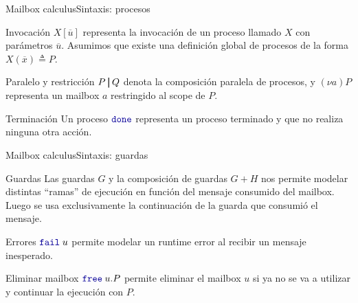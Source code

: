 \documentclass{beamer}
\newcommand{\done}{\texttt{\textcolor{keyword}{done}}}
\newcommand{\free}[1]{\texttt{\textcolor{keyword}{free}}\hspace{0.25em}#1}
\newcommand{\fail}[1]{\texttt{\textcolor{keyword}{fail}}\hspace{0.25em}#1}
\newcommand{\parbar}{\kern3pt\rule[-3pt]{0.8pt}{0.9\baselineskip}\kern3pt}
\begin{document}
\begin{frame}{Mailbox calculus}{Sintaxis: procesos}
    \begin{block}{Invocación}
        $X[\overline{u}]$ representa la invocación de un proceso llamado $X$ con parámetros $\overline{u}$. Asumimos que existe una definición global de procesos de la forma $X(\overline{x}) \triangleq P$.
    \end{block}

    \begin{block}{Paralelo y restricción}
        $P \parbar Q$ denota la composición paralela de procesos, y $(\nu a) P$ representa un mailbox $a$ restringido al scope de $P$.
    \end{block}

    \begin{block}{Terminación}
        Un proceso $\done$ representa un proceso terminado y que no realiza ninguna otra acción.
    \end{block}
\end{frame}

\begin{frame}{Mailbox calculus}{Sintaxis: guardas}
    \begin{block}{Guardas}
        Las guardas $G$ y la composición de guardas $G+H$ nos permite modelar distintas ``ramas'' de ejecución en función del mensaje consumido del mailbox. Luego se usa exclusivamente la continuación de la guarda que consumió el mensaje.
    \end{block}

    \begin{block}{Errores}
        $\fail{u}$ permite modelar un runtime error al recibir un mensaje inesperado.
    \end{block}

    \begin{block}{Eliminar mailbox}
        $\free{u}.P$ permite eliminar el mailbox $u$ si ya no se va a utilizar y continuar la ejecución con $P$.
    \end{block}
\end{frame}
\end{document}
